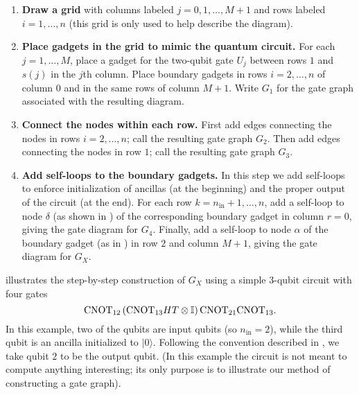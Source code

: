 \documentclass[../thesis-main/thesis-main]{subfiles}
\begin{document}
\begin{enumerate}
  \item \textbf{Draw a grid} with columns labeled $j=0,1,\ldots,M+1$ and rows labeled $i=1,\ldots,n$ (this grid is only used to help describe the diagram).
  \item \textbf{Place gadgets in the grid to mimic the quantum circuit.}
For each $j=1,\ldots,M$, place a gadget for the two-qubit gate $U_j$ between rows $1$ and $s(j)$ in the $j$th column. Place boundary gadgets in rows $i=2,\ldots,n$ of column $0$ and in the same rows of column $M+1$. Write $G_{1}$ for the gate graph associated with the resulting diagram.
  \item \textbf{Connect the nodes within each row.}
First add edges connecting the nodes in rows $i=2,\ldots,n$; call the resulting gate graph $G_{2}$. Then add edges connecting the nodes in row $1$; call the resulting gate graph $G_{3}$.
  \item \textbf{Add self-loops to the boundary gadgets.}
In this step we add self-loops to enforce initialization of ancillas (at the beginning) and the proper output of the circuit (at the end). For each row $k=n_{\text{in}}+1,\ldots,n$, add a self-loop to node $\delta$ (as shown in  ) of the corresponding boundary gadget in column $r=0$, giving the gate diagram for $G_{4}$. Finally, add a self-loop to node $\alpha$ of the boundary gadget (as in ) in row %
$2$ and column $M+1$, giving the gate diagram for $G_X$.
\end{enumerate}

 illustrates the step-by-step construction of $G_X$ using a simple $3$-qubit circuit with four gates 
\begin{equation}
  \mathrm{CNOT}_{12}\left(\mathrm{CNOT}_{13}HT\otimes\mathbb{I}\right)\mathrm{CNOT}_{21}\mathrm{CNOT}_{13}.
\end{equation}
In this example, two of the qubits are input qubits (so $n_{\text{in}}=2$), while the third qubit is an ancilla 
initialized to $|0\rangle$.
Following the convention described in , we take qubit $2$ to be the output qubit. (In this example the circuit is not meant to compute anything interesting; its only purpose is to illustrate our method of constructing a gate graph).
\end{document}
